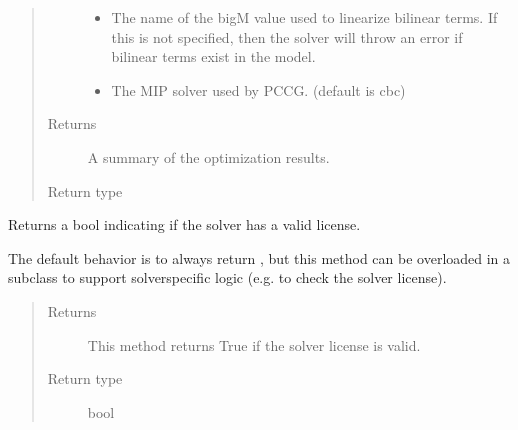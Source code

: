 \documentclass[letterpaper,10pt,english]{sphinxmanual}
\begin{document}
\begin{fulllineitems}
\begin{fulllineitems}
\begin{quote}
\begin{description}
\begin{itemize}
\item {} 
 \textendash{} The name of the big\sphinxhyphen{}M value used to linearize bilinear terms.  If this is not specified, then the solver will throw an error if bilinear terms exist in the model.

\item {} 
 \textendash{} The MIP solver used by PCCG.  (default is cbc)

\end{itemize}

\item[{Returns}] \leavevmode
A summary of the optimization results.

\item[{Return type}] \leavevmode
{\hyperref[\detokenize{reference/solverapi:pao.common.solver.Results}]{}}

\end{description}\end{quote}

\end{fulllineitems}


\begin{fulllineitems}
\label{\detokenize{reference/pyomo:pao.pyomo.solvers.mpr_solvers.PyomoSubmodelSolver_PCCG.valid_license}}
Returns a bool indicating if the solver has a valid license.

The default behavior is to always return , but this method
can be overloaded in a subclass to support solver\sphinxhyphen{}specific logic
(e.g.  to check the solver license).
\begin{quote}\begin{description}
\item[{Returns}] \leavevmode
This method returns True if the solver license is valid.

\item[{Return type}] \leavevmode
bool

\end{description}\end{quote}

\end{fulllineitems}


\end{fulllineitems}
\end{document}
